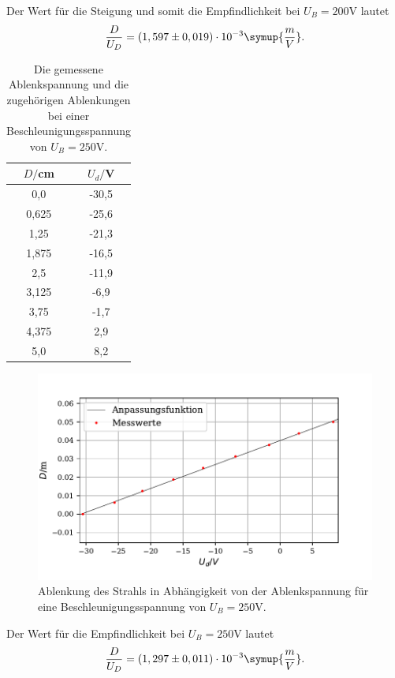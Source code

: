 Der Wert für die Steigung und somit die Empfindlichkeit bei $U_B = 200 \si{\volt}$ lautet
\begin{align*}
\frac{D}{U_D} = (1,597 \pm 0,019) \cdot 10^{-3} \symup{\frac{m}{V}} .
\end{align*}



\begin{table}[H]
  \centering
  \caption{Die gemessene Ablenkspannung und die zugehörigen Ablenkungen bei einer Beschleunigungsspannung von $U_B = 250 \si{\volt}$.}
  \label{tab:Parameter}
  \begin{tabular}{c c}
    \toprule
    $D/$cm& $U_d/$V \\
    \bottomrule
    0,0 & -30,5 \\
     0,625 & -25,6  \\
     1,25 & -21,3 \\
     1,875 & -16,5  \\
     2,5 & -11,9 \\
     3,125 & -6,9  \\
     3,75& -1,7 \\
     4,375 & 2,9  \\
     5,0 &  8,2 \\
     \bottomrule
  \end{tabular}
\end{table}

\begin{figure}[H]
  \centering
  \includegraphics{plot4.pdf}
  \caption{Ablenkung des Strahls in Abhängigkeit von der Ablenkspannung für eine Beschleunigungsspannung von $U_B = 250 \si{\volt}$. }
  \label{fig:plot}
\end{figure}

Der Wert für die Empfindlichkeit bei $U_B = 250 \si{\volt}$ lautet
\begin{align*}
\frac{D}{U_D} = (1,297 \pm 0,011) \cdot 10^{-3} \symup{\frac{m}{V}} .
\end{align*}

